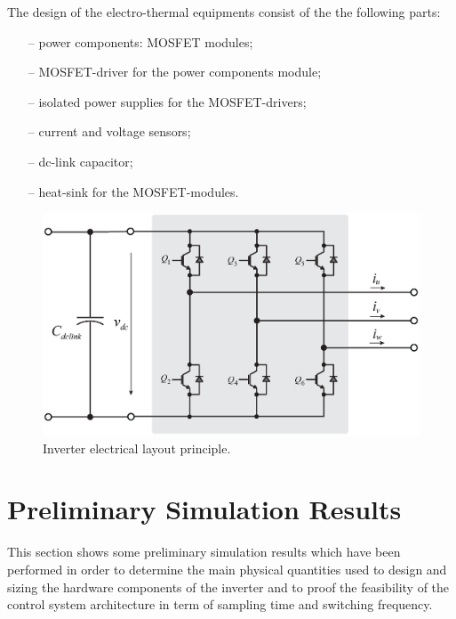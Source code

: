 \documentclass[11pt,a4paper,oneside]{book}
\numberwithin{equation}{section}
\theoremstyle{it}
\theoremstyle{definition}
\begin{document}
The design of the electro-thermal equipments consist of the the following parts:
\begin{itemize}
	\item[--] power components: MOSFET modules;
	\item[--] MOSFET-driver for the power components module;	
	\item[--] isolated power supplies for the MOSFET-drivers;
	\item[--] current and voltage sensors;
	\item[--] dc-link capacitor;
	\item[--] heat-sink for the MOSFET-modules.
\end{itemize}
\begin{figure}[H]
	\centering
	\includegraphics[width = 360pt, angle = 0, 
	keepaspectratio]{figures/electrical_layout/electrical_circuit_3.eps}
	\captionsetup{width=0.5\textwidth, font=small}	
	\caption{Inverter electrical layout principle.}
	\label{electrical_circuit_1}
\end{figure}

\section{Preliminary Simulation Results}
This section shows some preliminary simulation results which have been performed in order to determine the main physical quantities used to design and sizing the hardware components of the inverter and to proof the feasibility of the control system architecture in term of sampling time and switching frequency.
\end{document}
